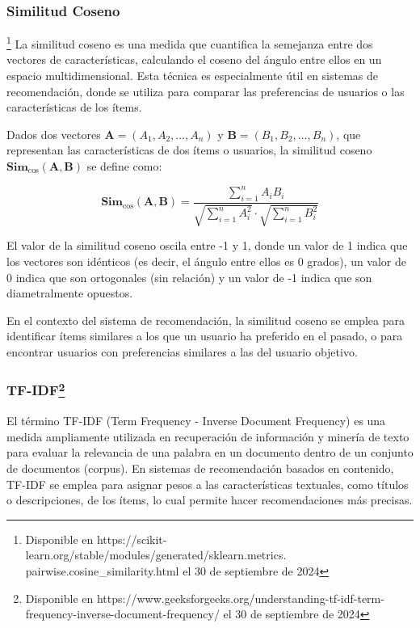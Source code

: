 \documentclass{llncs}
\begin{document}
	\subsubsection{Similitud Coseno}\footnote{Disponible en https://scikit-learn.org/stable/modules/generated/sklearn.metrics.\\pairwise.cosine\_similarity.html el 30 de septiembre de 2024}
	La similitud coseno es una medida que cuantifica la semejanza entre dos vectores de características, calculando el coseno del ángulo entre ellos en un espacio multidimensional. Esta técnica es especialmente útil en sistemas de recomendación, donde se utiliza para comparar las preferencias de usuarios o las características de los ítems.
	
	Dados dos vectores \( \mathbf{A} = (A_1, A_2, \ldots, A_n) \) y \( \mathbf{B} = (B_1, B_2, \ldots, B_n) \), que representan las características de dos ítems o usuarios, la similitud coseno \( \textbf{Sim}_{\cos}(\mathbf{A}, \mathbf{B}) \) se define como:
	
	\[
	\textbf{Sim}_{\cos}(\mathbf{A}, \mathbf{B}) = \frac{\sum_{i=1}^{n} A_i B_i}{\sqrt{\sum_{i=1}^{n} A_i^2} \cdot \sqrt{\sum_{i=1}^{n} B_i^2}}
	\]
	
	El valor de la similitud coseno oscila entre -1 y 1, donde un valor de 1 indica que los vectores son idénticos (es decir, el ángulo entre ellos es 0 grados), un valor de 0 indica que son ortogonales (sin relación) y un valor de -1 indica que son diametralmente opuestos.
	
	En el contexto del sistema de recomendación, la similitud coseno se emplea para identificar ítems similares a los que un usuario ha preferido en el pasado, o para encontrar usuarios con preferencias similares a las del usuario objetivo.
	
\subsubsection*{\centering \textbf{TF-IDF}\footnote{Disponible en https://www.geeksforgeeks.org/understanding-tf-idf-term-frequency-inverse-document-frequency/ el 30 de septiembre de 2024}}

El término TF-IDF (Term Frequency - Inverse Document Frequency) es una medida ampliamente utilizada en recuperación de información y minería de texto para evaluar la relevancia de una palabra en un documento dentro de un conjunto de documentos (corpus). En sistemas de recomendación basados en contenido, TF-IDF se emplea para asignar pesos a las características textuales, como títulos o descripciones, de los ítems, lo cual permite hacer recomendaciones más precisas.
\end{document}
